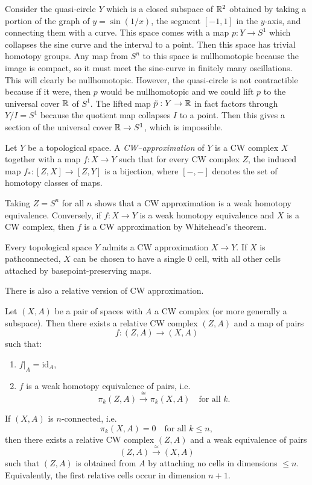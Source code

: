 \documentclass[12pt]{article}
\begin{document}
\begin{example}
    Consider the quasi-circle $Y$ which is a closed subspace of $\mathbb{R}^2$ obtained by taking a portion of the graph of $y = \sin(1/x)$, the segment $[-1,1]$ in the $y$-axis, and connecting them with a curve. This space comes with a map $p: Y \to S^1$ which collapses the sine curve and the interval to a point. Then this space has trivial homotopy groups. Any map from $S^n$ to this space is nullhomotopic because the image is compact, so it must meet the sine-curve in finitely many oscillations. This will clearly be nullhomotopic.  However, the quasi-circle is not contractible because if it were, then $p$ would be nullhomotopic and we could lift $p$ to the universal cover $\mathbb{R}$ of $S^1$. The lifted map $\tilde p: Y \to \mathbb{R}$ in fact factors through $Y/I = S^1$ because the quotient map collapses $I$ to a point. Then this gives a section of the universal cover $\mathbb{R} \to S^1$, which is impossible.
\end{example}

\begin{definition}
    Let $Y$ be a topological space. A \textit{CW--approximation} of $Y$ is a CW complex $X$ together with a map $f:X\to Y$ such that for every CW complex $Z$, the induced map $f_*:[Z,X]\to [Z,Y]$ is a bijection, where $[-,-]$ denotes the set of homotopy classes of maps.
\end{definition}
Taking $Z = S^n$ for all $n$ shows that a CW approximation is a weak homotopy equivalence. Conversely, if $f:X\to Y$ is a weak homotopy equivalence and $X$ is a CW complex, then $f$ is a CW approximation by Whitehead's theorem. 

\begin{theorem}
    Every topological space $Y$ admits a CW approximation $X\to Y$. If $X$ is pathconnected, $X$ can be chosen to have a single 0 cell, with all other cells attached by basepoint-preserving maps. 
\end{theorem}

There is also a relative version of CW approximation.  

\begin{theorem}
Let $(X,A)$ be a pair of spaces with $A$ a CW complex (or more generally a
subspace). Then there exists a relative CW complex $(Z,A)$ and a map of pairs
\[
f:(Z,A)\longrightarrow (X,A)
\]
such that:
\begin{enumerate}
    \item $f|_A = \mathrm{id}_A$,
    \item $f$ is a weak homotopy equivalence of pairs, i.e.
    \[
    \pi_k(Z,A) \xrightarrow{\;\cong\;} \pi_k(X,A)
    \quad \text{for all } k.
    \]
\end{enumerate}
If $(X,A)$ is $n$-connected,
i.e.
\[
\pi_k(X,A)=0 \quad \text{for all } k\le n,
\]
then there exists a relative CW complex $(Z,A)$ and a weak equivalence of
pairs
\[
(Z,A)\xrightarrow{\;\simeq\;} (X,A)
\]
such that $(Z,A)$ is obtained from $A$ by attaching no cells in dimensions $\le n$. Equivalently, the first relative cells occur in dimension $n+1$.
\end{theorem}
\end{document}
